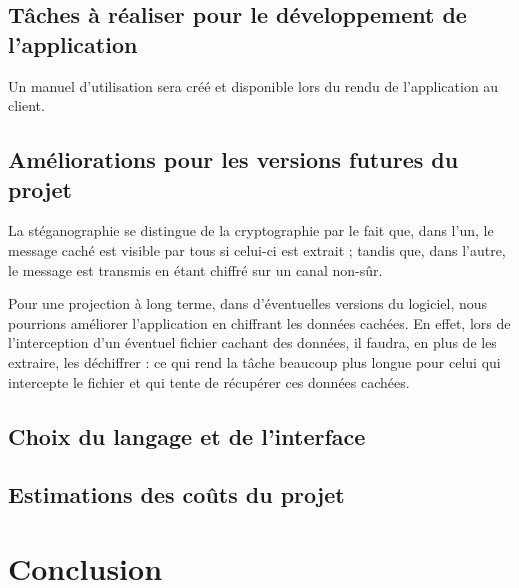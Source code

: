 \documentclass[11pt]{article}
\begin{document}
\subsection{Tâches à réaliser pour le développement de l'application} %
Un manuel d'utilisation sera créé et disponible lors du rendu de l'application au client. 

\subsection{Améliorations pour les versions futures du projet}
La stéganographie se distingue de la cryptographie par le fait que, dans l'un, le message caché est visible par tous si celui-ci est extrait ; tandis que, dans l'autre, 
le message est transmis en étant chiffré sur un canal non-sûr. 

Pour une projection à long terme, dans d'éventuelles versions du logiciel, nous pourrions améliorer l'application en chiffrant les données cachées. 
En effet, lors de l'interception d'un éventuel fichier cachant des données, il faudra, en plus de les extraire, les déchiffrer : ce qui rend la tâche beaucoup plus longue
pour celui qui intercepte le fichier et qui tente de récupérer ces données cachées. 

\subsection{Choix du langage et de l'interface}

\subsection{Estimations des coûts du projet}

\section{Conclusion}
\end{document}

